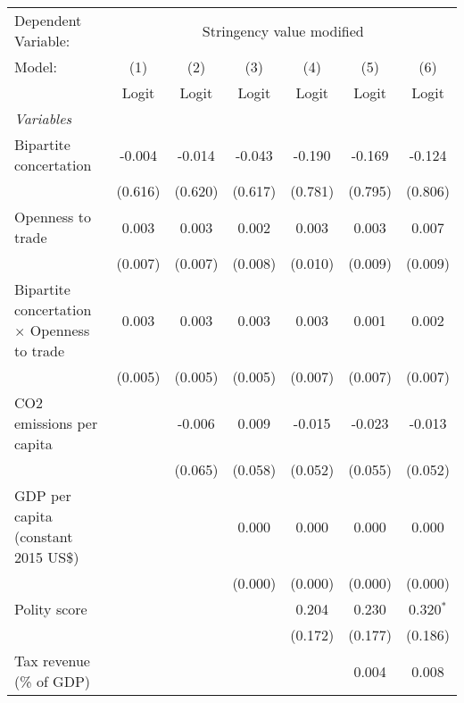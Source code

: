 
\begingroup
\centering
\begin{tabular}{lcccccc}
   \toprule
   Dependent Variable: & \multicolumn{6}{c}{Stringency value modified}\\
   Model:                                             & (1)     & (2)     & (3)     & (4)     & (5)     & (6)\\  
                                                      &  Logit  & Logit   & Logit   & Logit   & Logit   & Logit\\  
   \midrule
   \emph{Variables}\\
   Bipartite concertation                             & -0.004  & -0.014  & -0.043  & -0.190  & -0.169  & -0.124\\   
                                                      & (0.616) & (0.620) & (0.617) & (0.781) & (0.795) & (0.806)\\   
   Openness to trade                                  & 0.003   & 0.003   & 0.002   & 0.003   & 0.003   & 0.007\\   
                                                      & (0.007) & (0.007) & (0.008) & (0.010) & (0.009) & (0.009)\\   
   Bipartite concertation $\times$ Openness to trade  & 0.003   & 0.003   & 0.003   & 0.003   & 0.001   & 0.002\\   
                                                      & (0.005) & (0.005) & (0.005) & (0.007) & (0.007) & (0.007)\\   
   CO2 emissions per capita                           &         & -0.006  & 0.009   & -0.015  & -0.023  & -0.013\\   
                                                      &         & (0.065) & (0.058) & (0.052) & (0.055) & (0.052)\\   
   GDP per capita (constant 2015 US\$)                &         &         & 0.000   & 0.000   & 0.000   & 0.000\\   
                                                      &         &         & (0.000) & (0.000) & (0.000) & (0.000)\\   
   Polity score                                       &         &         &         & 0.204   & 0.230   & 0.320$^{*}$\\   
                                                      &         &         &         & (0.172) & (0.177) & (0.186)\\   
   Tax revenue (\% of GDP)                            &         &         &         &         & 0.004   & 0.008\\   

\end{tabular}
